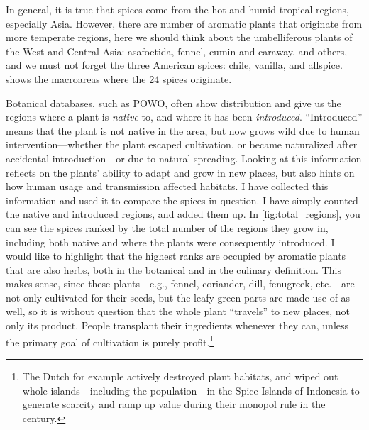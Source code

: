 In general, it is true that spices come from the hot and humid tropical regions, especially Asia. However, there are number of aromatic plants that originate from more temperate regions, here we should think about the umbelliferous plants of the West and Central Asia: asafoetida, fennel, cumin and caraway, and others, and we must not forget the three American spices: chile, vanilla, and allspice.   shows the macroareas where the 24 spices originate.

Botanical databases, such as \gls{POWO}, often show distribution and  give us the regions where a plant is \textit{native} to, and where it has been \textit{introduced}. ``Introduced'' means that the plant is not native in the area, but now grows wild due to human intervention---whether the plant escaped cultivation, or became naturalized after accidental introduction---or due to natural spreading. Looking at this information reflects on the plants' ability to adapt and grow in new places, but also hints on how human usage and transmission affected habitats. I have collected this information and used it to compare the spices in question. I have simply counted the native and introduced regions, and added them up. In \cref{fig:total_regions}, you can see the spices ranked by the total number of the regions they grow in, including both native and where the plants were consequently introduced. I would like to highlight that the highest ranks are occupied by aromatic plants that are also herbs, both in the botanical and in the culinary definition. This makes sense, since these plants---e.g., fennel, coriander, dill, fenugreek, etc.---are not only cultivated for their seeds, but the leafy green parts are made use of as well, so it is without question that the whole plant ``travels'' to new places, not only its product. People transplant their ingredients whenever they can, unless the primary goal of cultivation is purely profit.\footnote{The Dutch for example actively destroyed plant habitats, and wiped out whole islands---including the population---in the Spice Islands of Indonesia to generate scarcity and ramp up value during their monopol rule in the  century.}

